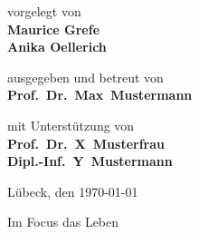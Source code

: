 \begin{titlepage}
{	\titlepageskip
	vorgelegt von\\
	{\textbf{Maurice Grefe}}\\
	{\textbf{Anika Oellerich}}

	\titlepageskip
	ausgegeben und betreut von\\
	{\textbf{Prof.~Dr.~Max~Mustermann}}

	\titlepageskip
	{
		mit Unterstützung von\\
		{\textbf{Prof.~Dr.~X~Musterfrau}}\\
		{\textbf{Dipl.-Inf.~Y~Mustermann}}\\
	}

	\titlepageskip
	{
	}

	\vfill 
	{
		Lübeck, den \today
	}

	{
		\titlepageskip
		Im Focus das Leben
	}
}
\end{titlepage}
\restoregeometry

\cleardoublepage

\begin{comment}
\newpage
\vspace*{7cm}
\centerline{\textbf{Erkl"arung}}

\vspace*{1cm}
Ich versichere an Eides statt, die vorliegende Arbeit selbstst"andig und nur unter Benutzung
der angegebenen Hilfsmittel angefertigt zu haben.

\vspace*{3cm}
Lübeck, den \today 

\pagestyle{headings}

\cleardoublepage
\end{comment}

